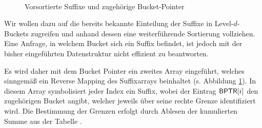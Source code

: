\begin{figure}
	\vspace{-1em}
	\\
	\caption[Vorsortierte Suffixe und zugehörige Bucket-Pointer]{Vorsortierte Suffixe und zugehörige Bucket-Pointer}
	\label{fig:bucket_pointer_initial}
\end{figure}
Wir wollen dazu auf die bereits bekannte Einteilung der Suffixe in Level-\(d\)-Buckets zugreifen und anhand dessen eine weiterführende Sortierung vollziehen. Eine Anfrage, in welchem Bucket sich ein Suffix befindet, ist jedoch mit der bisher eingeführten Datenstruktur nicht effizient zu beantworten. \par
Es wird daher mit dem Bucket Pointer \bptr ein zweites Array eingeführt, welches sinngemäß ein Reverse Mapping des Suffixarrays \sa beinhaltet (s. Abbildung \ref{fig:bucket_pointer_initial}). In diesem Array symbolisiert jeder Index ein Suffix, wobei der Eintrag \(\bptr[i]\) den zugehörigen Bucket angibt, welcher jeweils über seine rechte Grenze identifiziert wird. Die Bestimmung der Grenzen erfolgt durch Ablesen der kumulierten Summe aus der Tabelle \bkt.
